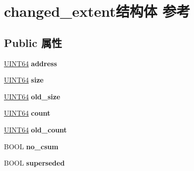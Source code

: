 \hypertarget{structchanged__extent}{}\section{changed\+\_\+extent结构体 参考}
\label{structchanged__extent}
\subsection*{Public 属性}
\begin{DoxyCompactItemize}
\item 
\mbox{\label{structchanged__extent_a46e32c90771e434b206b9213c3a8f018}} 
\hyperlink{_processor_bind_8h_a57be03562867144161c1bfee95ca8f7c}{U\+I\+N\+T64} {\bfseries address}
\item 
\mbox{\label{structchanged__extent_a9e87df22bbf9a8fadcda7acf4ba71a20}} 
\hyperlink{_processor_bind_8h_a57be03562867144161c1bfee95ca8f7c}{U\+I\+N\+T64} {\bfseries size}
\item 
\mbox{\label{structchanged__extent_a2253b0be075dcd70f1d487ecbbacce8f}} 
\hyperlink{_processor_bind_8h_a57be03562867144161c1bfee95ca8f7c}{U\+I\+N\+T64} {\bfseries old\+\_\+size}
\item 
\mbox{\label{structchanged__extent_a8c364a5267026851df60ac6f8fff1325}} 
\hyperlink{_processor_bind_8h_a57be03562867144161c1bfee95ca8f7c}{U\+I\+N\+T64} {\bfseries count}
\item 
\mbox{\label{structchanged__extent_a5af691b4bc0aeed6cfc13d2251cee383}} 
\hyperlink{_processor_bind_8h_a57be03562867144161c1bfee95ca8f7c}{U\+I\+N\+T64} {\bfseries old\+\_\+count}
\item 
\mbox{\label{structchanged__extent_ab186fa2735606e41afabbeef52161356}} 
B\+O\+OL {\bfseries no\+\_\+csum}
\item 
\mbox{\label{structchanged__extent_a09d39c33c179b2643fb8a6ad1ab418d4}} 
B\+O\+OL {\bfseries superseded}
\item 
\mbox{\label{structchanged__extent_af75ac4cf0b7386481a4d5b619fe68361}} 

\end{DoxyCompactItemize}
